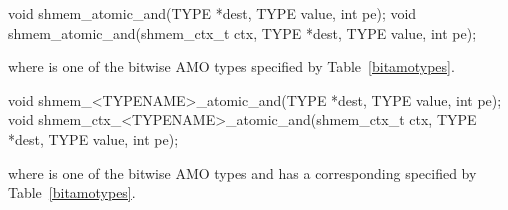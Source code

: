 
\begin{apidefinition}

\begin{C11synopsis}
void shmem_atomic_and(TYPE *dest, TYPE value, int pe);
void shmem_atomic_and(shmem_ctx_t ctx, TYPE *dest, TYPE value, int pe);
\end{C11synopsis}
where \TYPE{} is one of the bitwise \ac{AMO} types specified by
Table~\ref{bitamotypes}.

\begin{Csynopsis}
void shmem_<TYPENAME>_atomic_and(TYPE *dest, TYPE value, int pe);
void shmem_ctx_<TYPENAME>_atomic_and(shmem_ctx_t ctx, TYPE *dest, TYPE value, int pe);
\end{Csynopsis}
where \TYPE{} is one of the bitwise \ac{AMO} types and has a corresponding
\TYPENAME{} specified by Table~\ref{bitamotypes}.

\begin{apiarguments}


\end{apiarguments}




\end{apidefinition}
